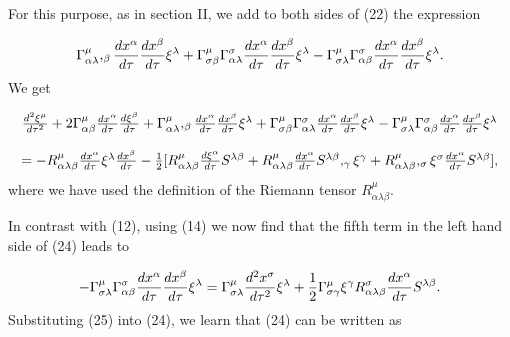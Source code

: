 \documentclass[a4paper,12pt]{article}
\begin{document}
For this purpose, as in section II, we add to both sides of (22) the
expression

\begin{equation}
\Gamma_{\alpha\lambda}^{\mu},_{\beta}\frac{dx^{\alpha}}{d\tau}\frac{%
dx^{\beta }}{d\tau}\xi^{\lambda}+\Gamma_{\sigma\beta}^{\mu}\Gamma_{\alpha%
\lambda }^{\sigma}\frac{dx^{\alpha}}{d\tau}\frac{dx^{\beta}}{d\tau}%
\xi^{\lambda }-\Gamma_{\sigma\lambda}^{\mu}\Gamma_{\alpha\beta}^{\sigma}%
\frac{dx^{\alpha}}{d\tau}\frac{dx^{\beta}}{d\tau}\xi^{\lambda}.  \label{23}
\end{equation}
We get

\begin{equation}
\begin{array}{c}
\frac{d^{2}\xi ^{\mu }}{d\tau ^{2}}+2\Gamma _{\alpha \beta }^{\mu }\frac{%
dx^{\alpha }}{d\tau }\frac{d\xi ^{\beta }}{d\tau }+\Gamma _{\alpha \lambda
}^{\mu },_{\beta }\frac{dx^{\alpha }}{d\tau }\frac{dx^{\beta }}{d\tau }\xi
^{\lambda }+\Gamma _{\sigma \beta }^{\mu }\Gamma _{\alpha \lambda }^{\sigma }%
\frac{dx^{\alpha }}{d\tau }\frac{dx^{\beta }}{d\tau }\xi ^{\lambda }-\Gamma
_{\sigma \lambda }^{\mu }\Gamma _{\alpha \beta }^{\sigma }\frac{dx^{\alpha }%
}{d\tau }\frac{dx^{\beta }}{d\tau }\xi ^{\lambda } \\ 
\\ 
=-R_{\alpha \lambda \beta }^{\mu }\frac{dx^{\alpha }}{d\tau }\xi ^{\lambda }%
\frac{dx^{\beta }}{d\tau }-\frac{1}{2}[R_{\alpha \lambda \beta }^{\mu }\frac{%
d\xi ^{\alpha }}{d\tau }S^{\lambda \beta }+R_{\alpha \lambda \beta }^{\mu }%
\frac{dx^{\alpha }}{d\tau }S^{\lambda \beta },_{\gamma }\xi ^{\gamma
}+R_{\alpha \lambda \beta }^{\mu },_{\sigma }\xi ^{\sigma }\frac{dx^{\alpha }%
}{d\tau }S^{\lambda \beta }],
\end{array}
\label{24}
\end{equation}
where we have used the definition of the Riemann tensor $R_{\alpha \lambda
\beta }^{\mu }.$

In contrast with (12), using (14) we now find that the fifth term in the
left hand side of (24) leads to

\begin{equation}
-\Gamma _{\sigma \lambda }^{\mu }\Gamma _{\alpha \beta }^{\sigma }\frac{%
dx^{\alpha }}{d\tau }\frac{dx^{\beta }}{d\tau }\xi ^{\lambda }=\Gamma
_{\sigma \lambda }^{\mu }\frac{d^{2}x^{\sigma }}{d\tau ^{2}}\xi ^{\lambda }+%
\frac{1}{2}\Gamma _{\sigma \gamma }^{\mu }\xi ^{\gamma }R_{\alpha \lambda
\beta }^{\sigma }\frac{dx^{\alpha }}{d\tau }S^{\lambda \beta }.  \label{25}
\end{equation}
Substituting (25) into (24), we learn that (24) can be written as
\end{document}
